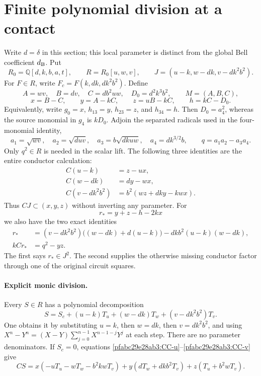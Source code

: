 \section{Finite polynomial division at a contact}
\label{component:pfabc29e28ab3}


Write $d=\delta$ in this section; this local parameter is distinct from
the global Bell coefficient $d_{\rm B}$. Put
\[
 R_0=\mathbb Q[d,k,b,a,t],\qquad R=R_0[u,w,v],\qquad
 J=(u-k,w-dk,v-dk^2b^2).
\]
For $F\in R$, write $F_c=F(k,dk,dk^2b^2)$. Define
\[
 A=wv,\quad B=dv,\quad C=db^2uw,\quad D_0=d^2k^3b^2,
 \qquad M=(A,B,C),
\]
\[
 x=B-C,\qquad y=A-kC,\qquad z=uB-kC,\qquad h=kC-D_0.
\]
Equivalently, write $g_0=x$, $h_{13}=y$, $h_{23}=z$, and $h_{34}=h$. Then
$D_0=a_4^2$, whereas the source monomial in $g_4$ is $kD_0$.
Adjoin the separated radicals used in the four-monomial identity,
\[
 a_1=\sqrt{wv},\quad a_2=\sqrt{duv},\quad
 a_3=b\sqrt{dkuw},\quad a_4=dk^{3/2}b,
 \qquad q=a_1a_2-a_3a_4.
\]
Only $q^2\in R$ is needed in the scalar lift. The following three identities
are the entire conductor calculation:
\begin{align}
 C(u-k)&=z-ux,\label{pfabc29e28ab3:CC-u}\\
 C(w-dk)&=dy-wx,\label{pfabc29e28ab3:CC-w}\\
 C(v-dk^2b^2)&=b^2(wz+dky-kwx).\label{pfabc29e28ab3:CC-v}
\end{align}
Thus $CJ\subset(x,y,z)$ without inverting any parameter.
For
\[
 r_*=y+z-h-2kx
\]
we also have the two exact identities
\begin{align}
 r_*&=(v-dk^2b^2)\bigl((w-dk)+d(u-k)\bigr)
       -dkb^2(u-k)(w-dk),\label{pfabc29e28ab3:CC-star}\\
 kCr_*&=q^2-yz.\label{pfabc29e28ab3:CC-repair}
\end{align}
The first says $r_*\in J^2$. The second supplies the otherwise missing
conductor factor through one of the original circuit squares.

\paragraph{Explicit monic division.}
Every $S\in R$ has a polynomial decomposition
\[
 S=S_c+(u-k)T_u+(w-dk)T_w+(v-dk^2b^2)T_v.                 \tag{CC1}
\]
One obtains it by substituting $u=k$, then $w=dk$, then $v=dk^2b^2$,
and using $X^n-Y^n=(X-Y)\sum_{j=0}^{n-1}X^{n-1-j}Y^j$ at each step.
There are no parameter denominators. If $S_c=0$, equations
\eqref{pfabc29e28ab3:CC-u}--\eqref{pfabc29e28ab3:CC-v} give
\[
 CS=x(-uT_u-wT_w-b^2kwT_v)
     +y(dT_w+dkb^2T_v)+z(T_u+b^2wT_v).                 \tag{CC2}
\]

